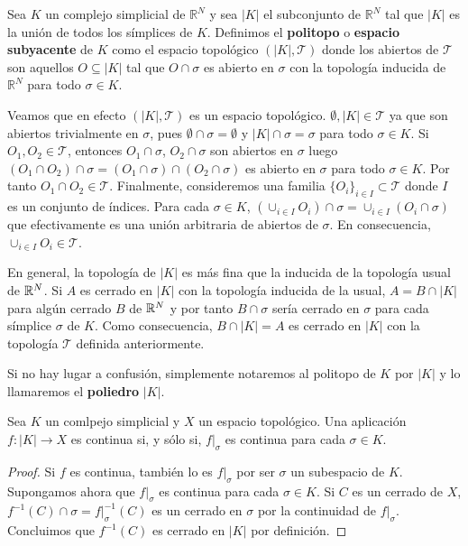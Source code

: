 \begin{definicion}
	Sea $K$ un complejo simplicial de $\mathbb{R}^N$ y sea $|K|$ el subconjunto de $\mathbb{R}^N$ tal que $|K|$ es la unión de todos los símplices de $K$. Definimos el \textbf{politopo} o \textbf{espacio subyacente} 
	de $K$ como el espacio topológico $(|K|, \mathcal{T})$ donde los abiertos de $\mathcal{T}$ son aquellos $O \subseteq |K|$ tal que $O \cap \sigma$ es abierto en $\sigma$ con la topología inducida de $\mathbb{R}^N$ para todo $\sigma \in K$.
\end{definicion}

Veamos que en efecto $(|K|, \mathcal{T})$ es un espacio topológico. $\emptyset, |K| \in \mathcal{T}$ ya que son abiertos trivialmente en $\sigma$, pues $\emptyset \cap \sigma = \emptyset$ y $|K| \cap \sigma = \sigma$ para todo $\sigma \in K$. Si $O_1, O_2 \in \mathcal{T}$, entonces $O_1 \cap \sigma$, $O_2 \cap \sigma$ son abiertos en $\sigma$ luego $(O_1 \cap O_2) \cap \sigma = (O_1 \cap \sigma) \cap (O_2 \cap \sigma)$ es abierto en $\sigma$ para todo $\sigma \in K$. Por tanto $O_1 \cap O_2 \in \mathcal{T}$. Finalmente, consideremos una familia $\{O_i\}_{i \in I} \subset \mathcal{T}$ donde $I$ es un conjunto de índices. Para cada $\sigma \in K$, $(\cup_{i \in I} O_i) \cap \sigma = \cup_{i \in I} (O_i \cap \sigma)$ que efectivamente es una unión arbitraria de abiertos de $\sigma$. En consecuencia, $\cup_{i \in I} O_i \in \mathcal{T}$.

En general, la topología de $|K|$ es más fina que la inducida de la topología usual de $\mathbb{R}^N$. Si $A$ es cerrado en $|K|$ con la topología inducida de la usual, $A=B \cap |K|$ para algún cerrado $B$ de $\mathbb{R}^N$ y por tanto $B \cap \sigma$ sería cerrado en $\sigma$ para cada símplice $\sigma$ de $K$. Como consecuencia, $B \cap |K|=A$ es cerrado en $|K|$ con la topología $\mathcal{T}$ definida anteriormente. 

Si no hay lugar a confusión, simplemente notaremos al politopo de $K$ por $|K|$ y lo llamaremos el \textbf{poliedro} $|K|$.

\begin{lema}\label{lem:cont_poly}
	Sea $K$ un comlpejo simplicial y $X$ un espacio topológico. Una aplicación $f: |K| \rightarrow X$ es continua si, y sólo si, $f|_{\sigma}$ es continua para cada $\sigma \in K$.
\end{lema}
\begin{proof}
	Si $f$ es continua, también lo es $f|_{\sigma}$ por ser $\sigma$ un subespacio de $K$. Supongamos ahora que $f|_{\sigma}$ es continua para cada $\sigma \in K$. Si $C$ es un cerrado de $X$, $f^{-1}(C) \cap \sigma = f|_{\sigma}^{-1}(C)$ es un cerrado en $\sigma$ por la continuidad de $f|_{\sigma}$. Concluimos que $f^{-1}(C)$ es cerrado en $|K|$ por definición.
\end{proof}

